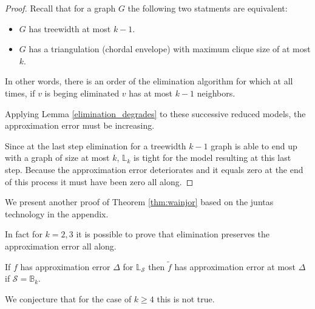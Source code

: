 \begin{proof}
Recall that for a graph $G$ the following two statments are equivalent:
\begin{itemize}
\item $G$ has treewidth at most $k-1$.
\item $G$ has a triangulation (chordal envelope) with maximum clique size of at most $k$.
\end{itemize}

In other words, there is an order of the elimination algorithm for which at all times, if $v$ is beging eliminated $v$ has at most $k-1$ neighbors.

Applying Lemma \ref{elimination_degrades} to these successive reduced models, the approximation error must be increasing. 

Since at the last step elimination for a treewidth $k-1$ graph is able to end up with a graph of size at most $k$, $\mathbb{L}_k$ is tight for the model resulting at this last step. Because the approximation error deteriorates and it equals zero at the end of this process it must have been zero all along. 

\end{proof}

We present another proof of Theorem \ref{thm:wainjor} based on the juntas technology in the appendix.

In fact for $k=2,3$ it is possible to prove that elimination preserves the approximation error all along. 

\begin{theorem} If $f$ has approximation error $\Delta$ for $\mathbb{L}_{\mathcal{S}}$ then $\tilde{f}$ has approximation error at most $\Delta$ if $\mathcal{S} = \mathbb{B}_k$. 
\end{theorem}

We conjecture that for the case of $k \geq 4$ this is not true. 








